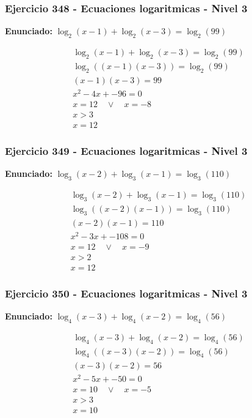 \documentclass[12pt,a4paper]{article}
\begin{document}
\subsubsection*{Ejercicio 348 - Ecuaciones logaritmicas - Nivel 3}
\textbf{Enunciado:} \(\log_{2}\left(x-1\right)+\log_{2}\left(x-3\right)=\log_{2}\left(99\right)\)

\[
\begin{aligned}
\log_{2}\left(x-1\right)+\log_{2}\left(x-3\right)=\log_{2}\left(99\right)\\
\log_{2}\left((x-1)(x-3)\right)=\log_{2}\left(99\right)\\
(x-1)(x-3)=99\\
x^2-4x+-96=0\\
x=12\quad \vee\quad x=-8\\
x>3\\
\boxed{x=12}
\end{aligned}
\]


\subsubsection*{Ejercicio 349 - Ecuaciones logaritmicas - Nivel 3}
\textbf{Enunciado:} \(\log_{3}\left(x-2\right)+\log_{3}\left(x-1\right)=\log_{3}\left(110\right)\)

\[
\begin{aligned}
\log_{3}\left(x-2\right)+\log_{3}\left(x-1\right)=\log_{3}\left(110\right)\\
\log_{3}\left((x-2)(x-1)\right)=\log_{3}\left(110\right)\\
(x-2)(x-1)=110\\
x^2-3x+-108=0\\
x=12\quad \vee\quad x=-9\\
x>2\\
\boxed{x=12}
\end{aligned}
\]


\subsubsection*{Ejercicio 350 - Ecuaciones logaritmicas - Nivel 3}
\textbf{Enunciado:} \(\log_{4}\left(x-3\right)+\log_{4}\left(x-2\right)=\log_{4}\left(56\right)\)

\[
\begin{aligned}
\log_{4}\left(x-3\right)+\log_{4}\left(x-2\right)=\log_{4}\left(56\right)\\
\log_{4}\left((x-3)(x-2)\right)=\log_{4}\left(56\right)\\
(x-3)(x-2)=56\\
x^2-5x+-50=0\\
x=10\quad \vee\quad x=-5\\
x>3\\
\boxed{x=10}
\end{aligned}
\]
\end{document}
